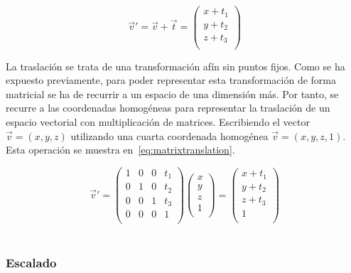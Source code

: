 \begin{equation}
	\label{eq:translation}
	\overrightarrow{v}' = \overrightarrow{v} + \overrightarrow{t} = 
	\left( \begin{array}{c}
			x + t_1 \\
			y + t_2 \\
			z + t_3 \\
	\end{array} \right)
\end{equation}

La traslación se trata de una transformación afín sin puntos fijos. Como se ha
expuesto previamente, para poder representar esta transformación de forma
matricial se ha de recurrir a un espacio de una dimensión más. Por tanto, se
recurre a las coordenadas homogéneas para representar la traslación de un
espacio vectorial con multiplicación de matrices. Escribiendo el vector
$\overrightarrow{v} = (x,y,z)$ utilizando una cuarta coordenada homogénea
$\overrightarrow{v} = (x,y,z,1)$. Esta operación se muestra
en~\eqref{eq:matrixtranslation}. 

\begin{equation}
	\label{eq:matrixtranslation}
	\overrightarrow{v}' = 
	\left( \begin{array}{cccc}
			1 & 0 & 0 & t_1 \\
			0 & 1 & 0 & t_2 \\
			0 & 0 & 1 & t_3 \\
			0 & 0 & 0 & 1 \\
	\end{array} \right)
	\left( \begin{array}{c}
			x \\
			y \\
			z \\
			1 \\
	\end{array} \right) = 
	\left( \begin{array}{c}
			x + t_1 \\
			y + t_2 \\
			z + t_3 \\
			1 \\
	\end{array} \right)
\end{equation}\\

\subsubsection{Escalado}
\label{makereference5.4.1.2}

